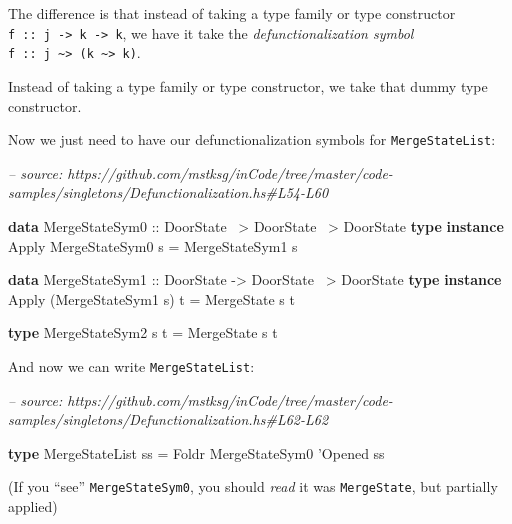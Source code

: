 \documentclass[]{article}
\newenvironment{Shaded}{}{}
\newcommand{\CommentTok}[1]{\textcolor[rgb]{0.38,0.63,0.69}{\textit{#1}}}
\newcommand{\DataTypeTok}[1]{\textcolor[rgb]{0.56,0.13,0.00}{#1}}
\newcommand{\FunctionTok}[1]{\textcolor[rgb]{0.02,0.16,0.49}{#1}}
\newcommand{\KeywordTok}[1]{\textcolor[rgb]{0.00,0.44,0.13}{\textbf{#1}}}
\newcommand{\NormalTok}[1]{#1}
\newcommand{\OtherTok}[1]{\textcolor[rgb]{0.00,0.44,0.13}{#1}}
\begin{document}
The difference is that instead of taking a type family or type constructor
\texttt{f\ ::\ j\ -\textgreater{}\ k\ -\textgreater{}\ k}, we have it take the
\emph{defunctionalization symbol}
\texttt{f\ ::\ j\ \textasciitilde{}\textgreater{}\ (k\ \textasciitilde{}\textgreater{}\ k)}.

Instead of taking a type family or type constructor, we take that dummy type
constructor.

Now we just need to have our defunctionalization symbols for
\texttt{MergeStateList}:

\begin{Shaded}
\begin{Highlighting}[]
\CommentTok{-- source: https://github.com/mstksg/inCode/tree/master/code-samples/singletons/Defunctionalization.hs#L54-L60}

\KeywordTok{data} \DataTypeTok{MergeStateSym0}\OtherTok{ ::} \DataTypeTok{DoorState} \FunctionTok{~>} \DataTypeTok{DoorState} \FunctionTok{~>} \DataTypeTok{DoorState}
\KeywordTok{type} \KeywordTok{instance} \DataTypeTok{Apply} \DataTypeTok{MergeStateSym0}\NormalTok{ s }\FunctionTok{=} \DataTypeTok{MergeStateSym1}\NormalTok{ s}

\KeywordTok{data} \DataTypeTok{MergeStateSym1}\OtherTok{ ::} \DataTypeTok{DoorState} \OtherTok{->} \DataTypeTok{DoorState} \FunctionTok{~>} \DataTypeTok{DoorState}
\KeywordTok{type} \KeywordTok{instance} \DataTypeTok{Apply}\NormalTok{ (}\DataTypeTok{MergeStateSym1}\NormalTok{ s) t }\FunctionTok{=} \DataTypeTok{MergeState}\NormalTok{ s t}

\KeywordTok{type} \DataTypeTok{MergeStateSym2}\NormalTok{ s t }\FunctionTok{=} \DataTypeTok{MergeState}\NormalTok{ s t}
\end{Highlighting}
\end{Shaded}

And now we can write \texttt{MergeStateList}:

\begin{Shaded}
\begin{Highlighting}[]
\CommentTok{-- source: https://github.com/mstksg/inCode/tree/master/code-samples/singletons/Defunctionalization.hs#L62-L62}

\KeywordTok{type} \DataTypeTok{MergeStateList}\NormalTok{ ss }\FunctionTok{=} \DataTypeTok{Foldr} \DataTypeTok{MergeStateSym0}\NormalTok{ '}\DataTypeTok{Opened}\NormalTok{ ss}
\end{Highlighting}
\end{Shaded}

(If you ``see'' \texttt{MergeStateSym0}, you should \emph{read} it was
\texttt{MergeState}, but partially applied)
\end{document}
